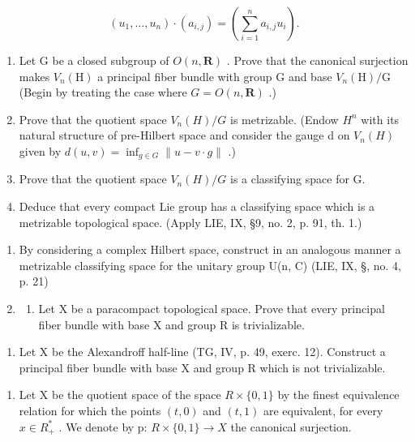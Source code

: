 \[
(u _ {1}, \dots , u _ {n}) \cdot (a _ {i, j}) = \left(\sum_ {i = 1} ^ {n} a _ {i, j} u _ {i}\right).
\]

\begin{enumerate}
\def\labelenumi{\alph{enumi})}
\setcounter{enumi}{1}
\item
  Let G be a closed subgroup of \(O(n,\mathbf{R})\) . Prove that the canonical surjection makes \(V_{n}(\mathrm{H})\) a principal fiber bundle with group G and base \(V_{n}(\mathrm{H})/\mathrm{G}\) (Begin by treating the case where \(G = O(n,\mathbf{R})\) .)
\item
  Prove that the quotient space \(V_{n}(H)/G\) is metrizable. (Endow \(H^{n}\) with its natural structure of pre-Hilbert space and consider the gauge d on \(V_{n}(H)\) given by \(d(u,v)=\inf_{g\in G}\|u-v\cdot g\|\) .)
\item
  Prove that the quotient space \(V_{n}(H)/G\) is a classifying space for G.
\item
  Deduce that every compact Lie group has a classifying space which is a metrizable topological space. (Apply LIE, IX, §9, no. 2, p. 91, th. 1.)
\end{enumerate}

\begin{enumerate}
\def\labelenumi{\arabic{enumi})}
\setcounter{enumi}{3}
\item
  By considering a complex Hilbert space, construct in an analogous manner a metrizable classifying space for the unitary group U(n, C) (LIE, IX, §, no. 4, p. 21)
\item
  \begin{enumerate}
  \def\labelenumii{\alph{enumii})}
  \tightlist
  \item
    Let X be a paracompact topological space. Prove that every principal fiber bundle with base X and group R is trivializable.
  \end{enumerate}
\end{enumerate}

\begin{enumerate}
\def\labelenumi{\alph{enumi})}
\setcounter{enumi}{1}
\tightlist
\item
  Let X be the Alexandroff half-line (TG, IV, p. 49, exerc. 12). Construct a principal fiber bundle with base X and group R which is not trivializable.
\end{enumerate}

\begin{enumerate}
\def\labelenumi{\arabic{enumi})}
\setcounter{enumi}{5}
\tightlist
\item
  Let X be the quotient space of the space \(R \times \{0,1\}\) by the finest equivalence relation for which the points \((t,0)\) and \((t,1)\) are equivalent, for every \(x \in R_{+}^{*}\) . We denote by p: \(R \times \{0,1\} \to X\) the canonical surjection.
\end{enumerate}


